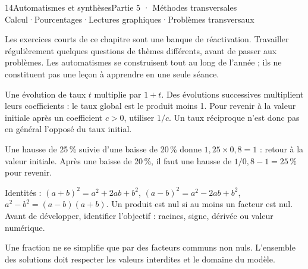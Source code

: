 \begin{ouverture}[boucles]{14}{Automatismes et synthèses}{Partie 5 · Méthodes transversales}
{Calcul\enspace·\enspace Pourcentages\enspace·\enspace Lectures graphiques\enspace·\enspace Problèmes transversaux}
\end{ouverture}
\essentiel
{}
\begin{savoirfaire}
Les exercices courts de ce chapitre sont une banque de réactivation.
Travailler régulièrement quelques questions de thèmes différents, avant
de passer aux problèmes. Les automatismes se construisent tout au long de
l'année ; ils ne constituent pas une leçon à apprendre en une seule séance.
\end{savoirfaire}
\begin{propriete}
Une évolution de taux $t$ multiplie par $1+t$. Des évolutions successives
multiplient leurs coefficients : le taux global est le produit moins 1.
Pour revenir à la valeur initiale après un coefficient $c>0$, utiliser $1/c$.
Un taux réciproque n'est donc pas en général l'opposé du taux initial.
\end{propriete}
\begin{exemple}
Une hausse de 25\,\% suivie d'une baisse de 20\,\% donne
$1{,}25\times0{,}8=1$ : retour à la valeur initiale.
Après une baisse de 20\,\%, il faut une hausse de $1/0{,}8-1=25\,\%$ pour revenir.
\end{exemple}
\begin{propriete}
Identités : $(a+b)^2=a^2+2ab+b^2$, $(a-b)^2=a^2-2ab+b^2$,
$a^2-b^2=(a-b)(a+b)$. Un produit est nul si au moins un facteur est nul.
Avant de développer, identifier l'objectif : racines, signe, dérivée ou valeur numérique.
\end{propriete}
\begin{attention}
Une fraction ne se simplifie que par des facteurs communs non nuls.
L'ensemble des solutions doit respecter les valeurs interdites et le domaine du modèle.
\end{attention}

